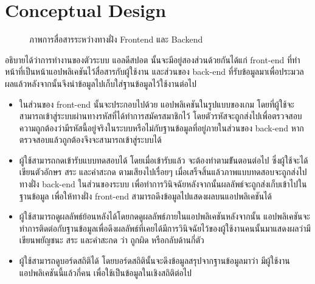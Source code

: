 \documentclass[12pt,oneside,openright,a4paper]{cpe-thai-project}
\begin{document}
\section{Conceptual  Design}
\begin{figure}[!ht]\centering
  \setlength{\fboxrule}{0.2mm} %
  \setlength{\fboxsep}{1cm}
  \caption{ภาพการสื่อสารระหว่างทางฝั่ง Frontend และ Backend}\label{fig:conceptual}
 \end{figure}
 อธิบายได้ว่าการทำงานของตัวระบบ แอลดีสปอต นั้นจะมีอยู่สองส่วนด้วยกันได้แก่ front-end ที่ทำหน้าที่เป็นหน้าแอปพลิเคชันไว้สื่อสารกับผู้ใช้งาน
  และส่วนของ back-end ที่รับข้อมูลมาเพื่อประมวลผลแล้วหลังจากนั้นจึงนำข้อมูลไปเก็บใส่ฐานข้อมูลไว้ใช้งานต่อไป 
 \begin{itemize}
   \item ในส่วนของ front-end นั้นจะประกอบไปด้วย แอปพลิเคชันในรูปแบบของเกม โดยที่ผู้ใช้จะสามารถเข้าสู่ระบบผ่านทางรหัสที่ได้ทำการสมัครสมาชิกไว้
    โดยตัวรหัสจะถูกส่งไปเพื่อตรวจสอบความถูกต้องว่ามีรหัสนี้อยู่จริงในระบบหรือไม่กับฐานข้อมูลที่อยู่ภายในส่วนของ back-end หากตรวจสอบแล้วถูกต้องจึงจะสามารถเข้าสู่ระบบได้ 
   \item ผู้ใช้สามารถกดเข้ารับแบบทดสอบได้ โดยเมื่อเข้ารับแล้ว จะต้องทำตามข้ันตอนต่อไป ซึ่งผู้ใช้จะได้เขียนตัวอักษร สระ และคำสะกด ตามเสียงไปเรื่อยๆ เมื่อเสร็จสิ้นแล้วภาพแบบทดสอบจะถูกส่งไปทางฝั่ง back-end 
   ในส่วนของระบบ 
    เพื่อทำการวินิจฉัยหลังจากนั้นผลลัพธ์จะถูกส่งเก็บเข้าไปในฐานข้อมูล เพื่อให้ทางฝั่ง front-end สามารถดึงข้อมูลไปแสดงผลบนแอปพลิเคชันได้
   \item ผู้ใช้สามารถดูผลลัพธ์ย้อนหลังได้โดยกดดูผลลัพธ์ภายในแอปพลิเคชันหลังจากนั้น แอปพลิเคชันจะทำการติดต่อกับฐานข้อมูลเพื่อดึงผลลัพธ์ที่เคยได้มีการวินิจฉัยไว้ของผู้ใช้งานคนนั้นมาแสดงผลว่ามีเขียนพยัญชนะ สระ และคำสะกด ว่า ถูกผิด หรือกลับด้านกี่ตัว
   \item ผู้ใช้สามารถดูบอร์ดสถิติได้ โดยบอร์ดสถิตินั้นจะดึงข้อมูลสรุปจากฐานข้อมูลมาว่า มีผู้ใช้งานแอปพลิเคชันนี้แล้วกี่คน  เพื่อใช้เป็นข้อมูลในเชิงสถิติต่อไป
 \end{itemize}
\end{document}
